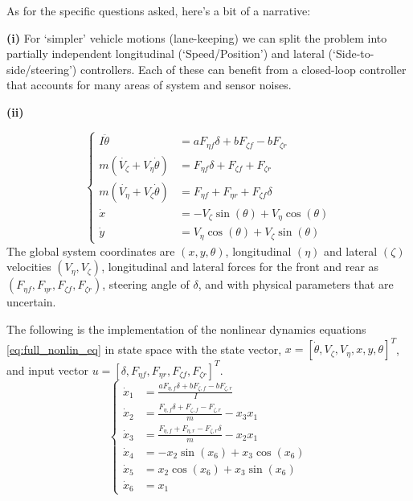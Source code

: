 \documentclass[]{article}
\begin{document}
As for the specific questions asked, here's a bit of a narrative:

\textbf{(i)}
For `simpler' vehicle motions (lane-keeping) we can split the problem into partially independent longitudinal (`Speed/Position') and lateral (`Side-to-side/steering') controllers.
Each of these can benefit from a closed-loop controller that accounts for many areas of system and sensor noises.

\textbf{(ii)}

\begin{equation}\begin{cases}
    I \ddot{\theta}     &= a F_{\eta f} \delta + b F_{\zeta f} - b F_{\zeta r}\\
    m (\dot{V_{\zeta}} + V_\eta \dot{\theta}) &= F_{\eta f} \delta + F_{\zeta f} + F_{\zeta r}\\
    m(\dot{V_{\eta}} + V_\zeta \dot{\theta}) &= F_{\eta f} + F_{\eta r} + F_{\zeta f} \delta\\
    \dot{x} &= -V_{\zeta} \sin(\theta) + V_{\eta} \cos(\theta)\\
    \dot{y} &= V_{\eta} \cos(\theta) + V_{\zeta} \sin(\theta)
\end{cases}\label{eq:full_nonlin_eq}\end{equation}
The global system coordinates are $(x, y, \theta)$, 
longitudinal $(\eta)$ and lateral $(\zeta)$ velocities $(V_\eta, V_\zeta)$,
longitudinal and lateral forces for the front and rear as $(F_{\eta f},F_{\eta r},F_{\zeta f},F_{\zeta r})$,
steering angle of $\delta$, 
and with physical parameters that are uncertain.

The following is the implementation of the nonlinear dynamics equations \eqref{eq:full_nonlin_eq} in state space with the state vector, $x = [\dot{\theta}, V_\zeta, V_\eta, x, y, \theta]^T$, and input vector $u = [\delta, F_{\eta f}, F_{\eta r}, F_{\zeta f}, F_{\zeta r}]^T$. 
\begin{equation}\begin{cases}
    \dot{x}_1 &= \frac{a F_{\eta,f} \delta + b F_{\zeta,f} - b F_{\zeta,r}}{I}\\
    \dot{x}_2 &= \frac{F_{\eta,f} \delta + F_{\zeta,f} - F_{\zeta,r}}{m} - x_3 x_1\\
    \dot{x}_3 &= \frac{F_{\eta,f} + F_{\eta,r} - F_{\zeta,r}\delta}{m} - x_2 x_1\\
    \dot{x}_4 &= -x_2 \sin(x_6) + x_3 \cos(x_6)\\
    \dot{x}_5 &= x_2 \cos(x_6) + x_3 \sin(x_6)\\
    \dot{x}_6 &= x_1
\end{cases}\end{equation}
\end{document}
